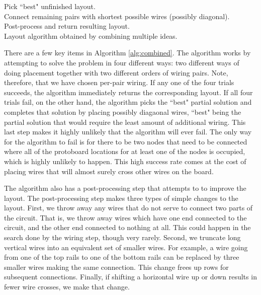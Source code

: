 \begin{algorithm}
\BlankLine
{}
Pick ``best" unfinished layout.\\
Connect remaining pairs with shortest possible wires (possibly diagonal).\\
Post-process and return resulting layout.\\
\caption{Layout algorithm obtained by combining multiple ideas.}
\label{alg:combined}
\end{algorithm}

There are a few key items in Algorithm \ref{alg:combined}. The algorithm works
by attempting to solve the problem in four different ways: two different ways of
doing placement together with two different orders of wiring pairs. Note,
therefore, that we have chosen per-pair wiring. If any one of the four trials
succeeds, the algorithm immediately returns the corresponding layout. If all
four trials fail, on the other hand, the algorithm picks the ``best" partial
solution and completes that solution by placing possibly diagaonal wires, ``best"
being the partial solution that would require the least amount of additional
wiring. This last step makes it highly unlikely that the algorithm will ever fail.
The only way for the algorithm to fail is for there to be two nodes that need to be
connected where all of the protoboard locations for at least one of the nodes is
occupied, which is highly unlikely to happen. This high success rate comes at the
cost of placing wires that will almost surely cross other wires on the board.

The algorithm also has a post-processing step that attempts to to improve the
layout. The post-processing step makes three types of simple changes to the
layout. First, we throw away any wires that do not serve to connect two parts
of the circuit. That is, we throw away wires which have one end connected to
the circuit, and the other end connected to nothing at all. This could happen
in the search done by the wiring step, though very rarely. Second, we truncate
long vertical wires into an equivalent set of smaller wires. For example, a wire
going from one of the top rails to one of the bottom rails can be replaced by
three smaller wires making the same connection. This change frees up rows for
subsequent connections. Finally, if shifting a horizontal wire up or down
results in fewer wire crosses, we make that change.

